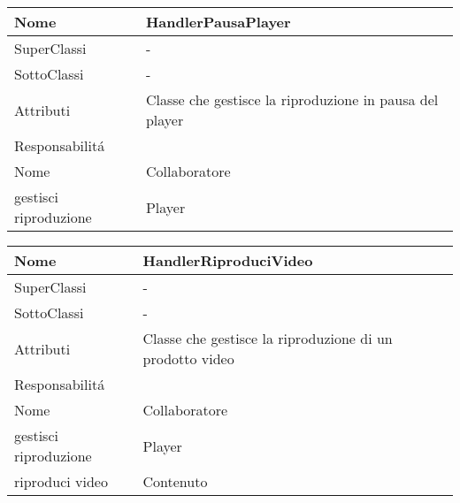 \begin{center}
    \begin{tabular}{ |p{3cm}|p{3cm}|p{3cm}|p{3cm}| }
        \hline
        Nome & \multicolumn{3}{|p{9cm}|}{HandlerPausaPlayer} \\\hline
        SuperClassi & \multicolumn{3}{|p{9cm}|}{-} \\\hline
        SottoClassi & \multicolumn{3}{|p{9cm}|}{-} \\\hline
        Attributi & \multicolumn{3}{|p{9cm}|}{Classe che gestisce la riproduzione in pausa del player} \\\hline
        \multicolumn{4}{|p{12cm}|}{Responsabilit\'a} \\\hline
        \multicolumn{2}{|p{6cm}|}{Nome} & \multicolumn{2}{|p{6cm}|}{Collaboratore} \\\hline
        \multicolumn{2}{|p{6cm}|}{gestisci riproduzione} & \multicolumn{2}{|p{6cm}|}{Player} \\\hline
    \end{tabular}
\end{center}

\begin{center}
    \begin{tabular}{ |p{3cm}|p{3cm}|p{3cm}|p{3cm}| }
        \hline
        Nome & \multicolumn{3}{|p{9cm}|}{HandlerRiproduciVideo} \\\hline
        SuperClassi & \multicolumn{3}{|p{9cm}|}{-} \\\hline
        SottoClassi & \multicolumn{3}{|p{9cm}|}{-} \\\hline
        Attributi & \multicolumn{3}{|p{9cm}|}{Classe che gestisce la riproduzione di un prodotto video} \\\hline
        \multicolumn{4}{|p{12cm}|}{Responsabilit\'a} \\\hline
        \multicolumn{2}{|p{6cm}|}{Nome} & \multicolumn{2}{|p{6cm}|}{Collaboratore} \\\hline
        \multicolumn{2}{|p{6cm}|}{gestisci riproduzione} & \multicolumn{2}{|p{6cm}|}{Player} \\\hline
        \multicolumn{2}{|p{6cm}|}{riproduci video} & \multicolumn{2}{|p{6cm}|}{Contenuto} \\\hline
    \end{tabular}
\end{center}

